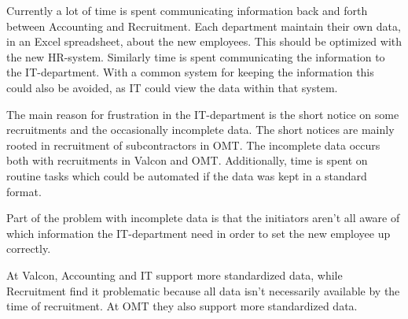 Currently a lot of time is spent communicating information back and forth between Accounting and Recruitment. 
Each department maintain their own data, in an Excel spreadsheet, about the new employees. 
This should be optimized with the new HR-system.
Similarly time is spent communicating the information to the IT-department.
With a common system for keeping the information this could also be avoided, as IT could view the data within that system.

The main reason for frustration in the IT-department is the short notice on some recruitments and the occasionally incomplete data.
The short notices are mainly rooted in recruitment of subcontractors in OMT.
The incomplete data occurs both with recruitments in Valcon and OMT.
Additionally, time is spent on routine tasks which could be automated if the data was kept in a standard format.

Part of the problem with incomplete data is that the initiators aren't all aware of which information the IT-department need in order to set the new employee up correctly.

At Valcon, Accounting and IT support more standardized data, while Recruitment find it problematic because all data isn't necessarily available by the time of recruitment.
At OMT they also support more standardized data.

